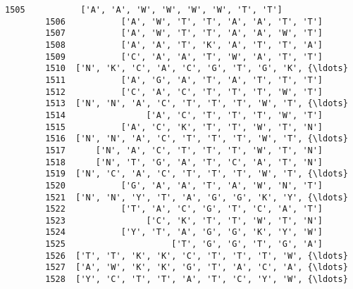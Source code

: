 \documentclass[11pt]{article}
\begin{document}
\begin{Verbatim}[commandchars=\\\{\}]
        1505           ['A', 'A', 'W', 'W', 'W', 'W', 'T', 'T']   
        1506           ['A', 'W', 'T', 'T', 'A', 'A', 'T', 'T']   
        1507           ['A', 'W', 'T', 'T', 'A', 'A', 'W', 'T']   
        1508           ['A', 'A', 'T', 'K', 'A', 'T', 'T', 'A']   
        1509           ['C', 'A', 'A', 'T', 'W', 'A', 'T', 'T']   
        1510  ['N', 'K', 'C', 'A', 'C', 'G', 'T', 'G', 'K', {\ldots}   
        1511           ['A', 'G', 'A', 'T', 'A', 'T', 'T', 'T']   
        1512           ['C', 'A', 'C', 'T', 'T', 'T', 'W', 'T']   
        1513  ['N', 'N', 'A', 'C', 'T', 'T', 'T', 'W', 'T', {\ldots}   
        1514                ['A', 'C', 'T', 'T', 'T', 'W', 'T']   
        1515           ['A', 'C', 'K', 'T', 'T', 'W', 'T', 'N']   
        1516  ['N', 'N', 'A', 'C', 'T', 'T', 'T', 'W', 'T', {\ldots}   
        1517      ['N', 'A', 'C', 'T', 'T', 'T', 'W', 'T', 'N']   
        1518      ['N', 'T', 'G', 'A', 'T', 'C', 'A', 'T', 'N']   
        1519  ['N', 'C', 'A', 'C', 'T', 'T', 'T', 'W', 'T', {\ldots}   
        1520           ['G', 'A', 'A', 'T', 'A', 'W', 'N', 'T']   
        1521  ['N', 'N', 'Y', 'T', 'A', 'G', 'G', 'K', 'Y', {\ldots}   
        1522           ['T', 'A', 'C', 'G', 'T', 'C', 'A', 'T']   
        1523                ['C', 'K', 'T', 'T', 'W', 'T', 'N']   
        1524           ['Y', 'T', 'A', 'G', 'G', 'K', 'Y', 'W']   
        1525                     ['T', 'G', 'G', 'T', 'G', 'A']   
        1526  ['T', 'T', 'K', 'K', 'C', 'T', 'T', 'T', 'W', {\ldots}   
        1527  ['A', 'W', 'K', 'K', 'G', 'T', 'A', 'C', 'A', {\ldots}   
        1528  ['Y', 'C', 'T', 'T', 'A', 'T', 'C', 'Y', 'W', {\ldots}   
        

\end{Verbatim}
\end{document}
